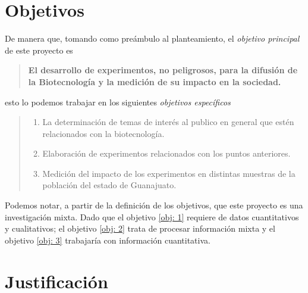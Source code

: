 \documentclass[12pt]{article}
\begin{document}
\newpage
\section{Objetivos}

	\par De manera que, tomando como preámbulo al planteamiento, el \textit{ objetivo principal } de este proyecto es	
	\begin{quote}
		\textbf{El desarrollo de experimentos, no peligrosos, para la difusión de la Biotecnología y la medición de su impacto en la sociedad. }
	\end{quote}
	
	\noindent esto lo podemos trabajar en los siguientes \textit{ objetivos específicos }
	
	\begin{quote} \begin{enumerate} \it
		\item La determinación de temas de interés al publico en general que estén relacionados con la biotecnología. \label{obj: 1}
		\item Elaboración de experimentos relacionados con los puntos anteriores. \label{obj: 2}
		\item Medición del impacto de los experimentos en distintas muestras de la población del estado de Guanajuato. \label{obj: 3}
	\end{enumerate} \end{quote}
	
	\noindent Podemos notar, a partir de la definición de los objetivos, que este proyecto es una investigación mixta. Dado que el objetivo \ref{obj: 1} requiere de datos cuantitativos y cualitativos; el objetivo \ref{obj: 2} trata de procesar información mixta y el objetivo \ref{obj: 3} trabajaría con información cuantitativa.






	
\section{Justificación}
\end{document}

